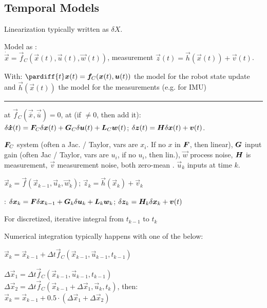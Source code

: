 \subsection{Temporal Models}
\label{sec:temporal-models}
\inlinenotation Linearization typically written as $\delta X$.

Model  as :\\
$\dot{\vec{x}} = \vec{f}_C(\vec{x}(t), \vec{u}(t), \vec{w}(t))$, measurement $\vec{z}(t) = \vec{h}(\vec{x}(t)) + \vec{v}(t)$.

With: $\pardiff{t}\vec{x}(t) = \vec{f}_C(\vec{x}(t), \vec{u}(t))$ the model for the robot state update and $\vec{h}(\vec{x}(t))$ the model for the measurements (e.g. for IMU)

\vspace{0.5mm}
\hrule
\vspace{0.5mm}

 at $\vec{f}_C(\vec{\overline{x}}, \vec{\overline{u}}) = 0$, at  {\scriptsize (if $\neq 0$, then add it)}:\\
$\delta \bm{\dot{x}}(t) = \bm{F}_C \delta \bm{x}(t) + \bm{G}_C \delta \bm{u}(t) + \bm{L}_C \bm{w}(t)$;
$\delta \bm{z}(t) = \bm{H} \delta \bm{x}(t) + \bm{v}(t)$.

$\bm{F}_C$ system (often a Jac. / Taylor, vars are $x_i$. If no $x$ in $\bm{F}$, then linear),
$\bm{G}$ input gain (often Jac / Taylor, vars are $u_i$, if no $u_i$, then lin.), $\vec{w}$ process noise, $\bm{H}$ is measurement, $\vec{v}$ measurement noise,
both zero-mean . $\vec{u}_k$ inputs at time $k$.

$\vec{x}_k = \vec{f}(\vec{x}_{k - 1}, \vec{u}_k, \vec{w}_k)$;
$\vec{z}_k = \vec{h}(\vec{x}_k) + \vec{v}_k$

:
$\delta \bm{x}_k = \bm{F} \delta \bm{x}_{k - 1} + \bm{G}_k \delta \bm{u}_k + \bm{L}_k \bm{w}_k$;
$\delta \bm{z}_k = \bm{H}_k \delta \bm{x}_k + \bm{v}(t)$

For discretized, iterative integral from $t_{k - 1}$ to $t_k$

Numerical integration typically happens with one of the below:

 $\vec{x}_k = \vec{x}_{k - 1} + \Delta t \vec{f}_C(\vec{x}_{k - 1}, \vec{u}_{k - 1}, t_{k - 1})$

$\Delta \vec{x}_1 = \Delta t \vec{f}_C (\vec{x}_{k - 1}, \vec{u}_{k - 1}, t_{k - 1})$\\
$\Delta \vec{x}_2 = \Delta t \vec{f}_C (\vec{x}_{k - 1} + \Delta \vec{x}_1, \vec{u}_{k}, t_{k})$, then:\\
$\vec{x}_k = \vec{x}_{k - 1} + 0.5 \cdot (\Delta \vec{x}_1 + \Delta \vec{x}_2)$
